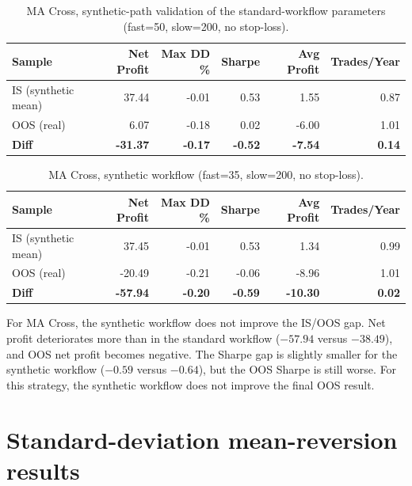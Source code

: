 \begin{table}[H]
    \centering
    \begin{tabular}{lrrrrr}
        \toprule
        Sample & Net Profit & Max DD \% & Sharpe & Avg Profit & Trades/Year \\
        \midrule
        IS (synthetic mean) & 37.44 & -0.01 & 0.53 & 1.55 & 0.87 \\
        OOS (real)           & 6.07  & -0.18 & 0.02 & -6.00 & 1.01 \\
        \textbf{Diff}          & \textbf{-31.37} & \textbf{-0.17} & \textbf{-0.52} & \textbf{-7.54} & \textbf{0.14} \\
        \bottomrule
    \end{tabular}
    \caption{MA Cross, synthetic-path validation of the standard-workflow parameters (fast=50, slow=200, no stop-loss).}
    \label{tab:mac-validation}
\end{table}

\begin{table}[H]
    \centering
    \begin{tabular}{lrrrrr}
        \toprule
        Sample & Net Profit & Max DD \% & Sharpe & Avg Profit & Trades/Year \\
        \midrule
        IS (synthetic mean) & 37.45  & -0.01 & 0.53  & 1.34   & 0.99 \\
        OOS (real)           & -20.49 & -0.21 & -0.06 & -8.96  & 1.01 \\
        \textbf{Diff}          & \textbf{-57.94} & \textbf{-0.20} & \textbf{-0.59} & \textbf{-10.30} & \textbf{0.02} \\
        \bottomrule
    \end{tabular}
    \caption{MA Cross, synthetic workflow (fast=35, slow=200, no stop-loss).}
    \label{tab:mac-synthetic}
\end{table}

For MA Cross, the synthetic workflow does not improve the IS/OOS gap. Net profit deteriorates more than
in the standard workflow (\(-57.94\) versus \(-38.49\)), and OOS net profit becomes negative. The Sharpe
gap is slightly smaller for the synthetic workflow (\(-0.59\) versus \(-0.64\)), but the OOS Sharpe is
still worse. For this strategy, the synthetic workflow does not improve the final OOS result.

\section{Standard-deviation mean-reversion results}

